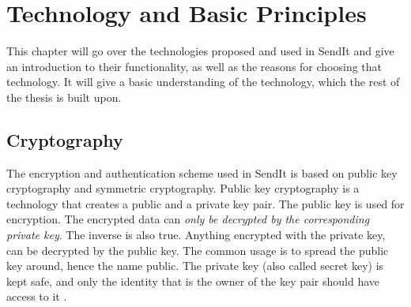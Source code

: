 %
\chapter{Technology and Basic Principles} %
\label{Chapter2} %
%
        







        


    
%
%
This chapter will go over the technologies proposed and used in SendIt and give an introduction to their functionality, as well as the reasons for choosing that technology. It will give a basic understanding of the technology, which the rest of the thesis is built upon.
%
\section{Cryptography}
\label{sec:pkc}
%
    The encryption and authentication scheme used in SendIt is based on public key cryptography and symmetric cryptography. Public key cryptography is a technology that creates a public and a private key pair. The public key is used for encryption. The encrypted data can \emph{only be decrypted by the corresponding private key}. The inverse is also true. Anything encrypted with the private key, can be decrypted by the public key. The common usage is to spread the public key around, hence the name public. The private key (also called secret key) is kept safe, and only the identity that is the owner of the key pair should have access to it \cite{trcekManagingInformationSystems2006}.

